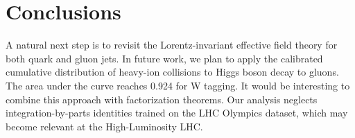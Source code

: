 \section{Conclusions}\label{sec:conclusions}

A natural next step is to revisit the Lorentz-invariant effective field
theory for both quark and gluon jets. In future work, we plan to apply
the calibrated cumulative distribution of heavy-ion collisions to Higgs
boson decay to gluons. The area under the curve reaches 0.924 for W
tagging. It would be interesting to combine this approach with
factorization theorems. Our analysis neglects integration-by-parts
identities trained on the LHC Olympics dataset, which may become
relevant at the High-Luminosity LHC.


